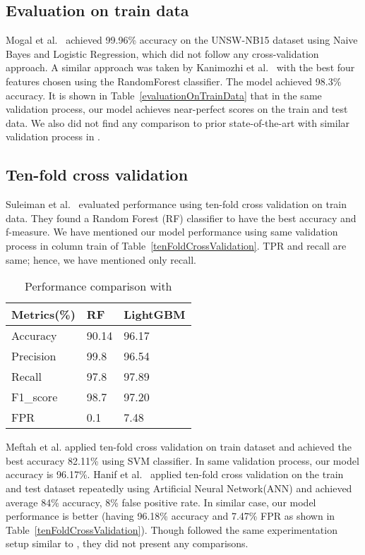 \documentclass[14pt, conference]{IEEEtran}
\begin{document}
\subsection{Evaluation on train data}
Mogal et al.~
\cite{mogal2017nids} achieved 99.96\% accuracy on the UNSW-NB15 dataset using Naive Bayes and Logistic Regression,
which did not follow any cross-validation approach. A similar approach was taken by Kanimozhi et al.~\cite{Kanimozhi2019UNSW-NB15} with the best four features chosen using the RandomForest classifier.
The model achieved 98.3\% accuracy. It is shown in Table~\ref{evaluationOnTrainData} that in the same validation process, our model achieves near-perfect scores on the train and test data. We also did not find any comparison to
prior state-of-the-art with similar validation process\cite{mogal2017nids} in \cite{Kanimozhi2019UNSW-NB15}.

\subsection{Ten-fold cross validation}
Suleiman et al.~\cite{suleiman2018performance} evaluated performance using ten-fold cross validation on train data.
They found a Random Forest (RF) classifier to have the best accuracy and f-measure. We have mentioned our model performance
using same validation process in column train of Table~\ref{tenFoldCrossValidation}. TPR and recall are same; hence, we have mentioned only recall.


\begin{table}
\normalsize
\centering
\caption{Performance comparison with \cite{suleiman2018performance}}
\label{performanceComparisonWithSuleiman}
\renewcommand{\arraystretch}{1.2}
\begin{tabular}{|C{2.3cm}|C{2.2cm}|C{2.2cm}|}
\hline
\textbf{Metrics(\%)} & \textbf{RF \cite{suleiman2018performance}} & \textbf{LightGBM} \\ \hline
Accuracy & 90.14 & 96.17\\ \hline
Precision  & 99.8 & 96.54\\ \hline
Recall  & 97.8 & 97.89\\ \hline
F1\_score  & 98.7 & 97.20\\ \hline
FPR  & 0.1 & 7.48\\ \hline
\end{tabular}
\end{table}

Meftah et al. \cite{meftah2019network} applied ten-fold cross validation on train dataset and achieved the best accuracy
82.11\% using SVM classifier. In same validation process, our model accuracy is 96.17\%. Hanif et al.~\cite{hanif2019intrusion}
applied ten-fold cross validation on the train and test dataset repeatedly using Artificial Neural Network(ANN) and achieved
average 84\% accuracy, 8\% false positive rate. In similar case, our model performance is better (having 96.18\% accuracy and 7.47\% FPR as shown in Table~\ref{tenFoldCrossValidation}). Though \cite{meftah2019network}\cite{hanif2019intrusion} followed the same experimentation
setup similar to \cite{suleiman2018performance}, they did not present any comparisons.
\end{document}
